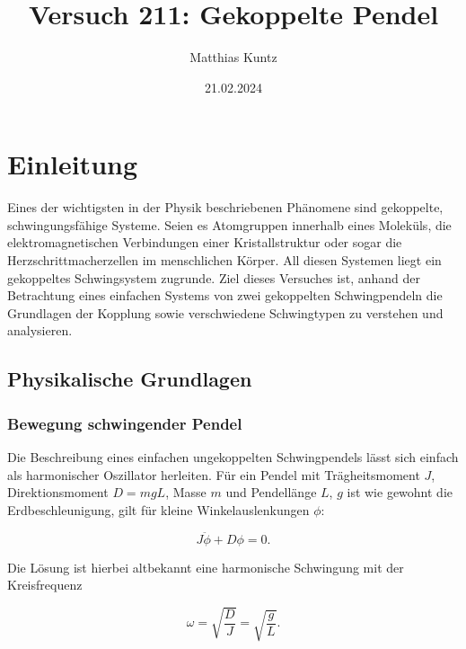 \documentclass{article}
\title{Versuch 211: Gekoppelte Pendel}
\author{Matthias Kuntz}
\date{21.02.2024}
\begin{document}
\maketitle

\tableofcontents

\newpage

\section{Einleitung}

Eines der wichtigsten in der Physik beschriebenen Phänomene sind gekoppelte, schwingungsfähige Systeme. Seien es Atomgruppen innerhalb eines Moleküls, die elektromagnetischen Verbindungen einer Kristallstruktur oder sogar die Herzschrittmacherzellen im menschlichen Körper. All diesen Systemen liegt ein gekoppeltes Schwingsystem zugrunde. Ziel dieses Versuches ist, anhand der Betrachtung eines einfachen Systems von zwei gekoppelten Schwingpendeln die Grundlagen der Kopplung sowie verschwiedene Schwingtypen zu verstehen und analysieren.  

\subsection{Physikalische Grundlagen}

\subsubsection{Bewegung schwingender Pendel}

Die Beschreibung eines einfachen ungekoppelten Schwingpendels lässt sich einfach als harmonischer Oszillator herleiten. Für ein Pendel mit Trägheitsmoment $J$, Direktionsmoment $D = mgL$, Masse $m$ und Pendellänge $L$, $g$ ist wie gewohnt die Erdbeschleunigung, gilt für kleine Winkelauslenkungen $\phi$:

\begin{equation}
    J \ddot{\phi} + D \phi = 0.
    \label{eq:einfach_ungekoppeltes_Pendel}
\end{equation}

Die Lösung ist hierbei altbekannt eine harmonische Schwingung mit der Kreisfrequenz

\begin{equation}
    \omega = \sqrt{\frac{D}{J}} = \sqrt{\frac{g}{L}}.
    \label{eq:kreisfreq_harm}
\end{equation}
\end{document}
